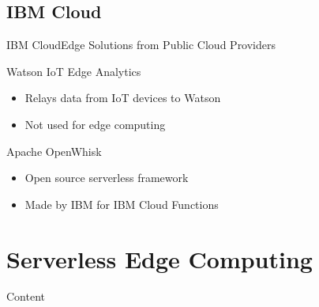 \documentclass[10pt,xcolor={dvipsnames}]{beamer}
\renewcommand{\logofile}{example-grid-100x100pt}
\renewcommand{\logoscale}{0.0}
\begin{document}
\subsection{IBM Cloud}
\renewcommand{\logofile}{img/ibm_cloud_functions}
\renewcommand{\logoscale}{1}
\begin{frame}{IBM Cloud}{Edge Solutions from Public Cloud Providers}

\begin{block}{Watson IoT Edge Analytics}
\begin{itemize}
    \item Relays data from IoT devices to Watson
    \item Not used for edge computing
\end{itemize}
\end{block}

\begin{block}{Apache OpenWhisk}
\begin{itemize}
    \item Open source serverless framework
    \item Made by IBM for IBM Cloud Functions
\end{itemize}
\end{block}
\end{frame}

\section{Serverless Edge Computing}
\renewcommand{\logoscale}{0}
\begin{frame}{Content}{}
\tableofcontents[currentsection]
\end{frame}

\end{document}
